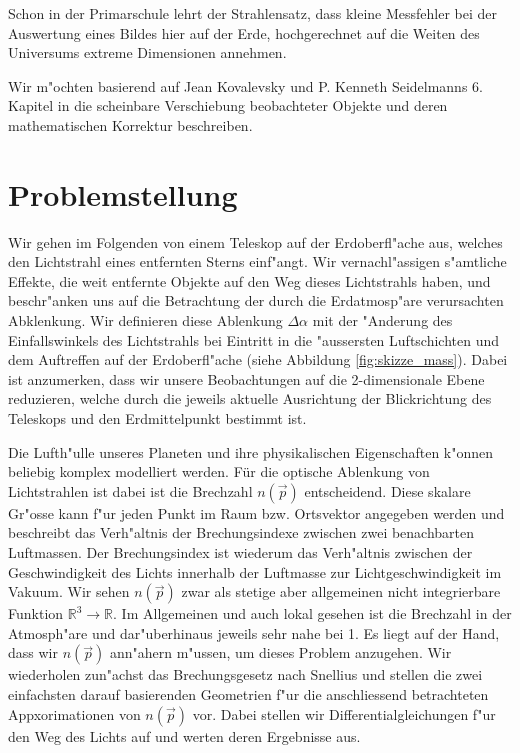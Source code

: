 \begin{refsection}
Schon in der Primarschule lehrt der Strahlensatz, dass kleine Messfehler bei der Auswertung eines Bildes hier auf der Erde, hochgerechnet auf die Weiten des Universums extreme Dimensionen annehmen.
 
Wir m"ochten basierend auf Jean Kovalevsky und P. Kenneth Seidelmanns 6. Kapitel in \cite[s. 121ff]{licht:astrometry} die scheinbare Verschiebung beobachteter Objekte und deren mathematischen Korrektur beschreiben. 

\section{Problemstellung}

Wir gehen im Folgenden von einem Teleskop auf der Erdoberfl"ache aus, welches den Lichtstrahl eines entfernten Sterns einf"angt. 
Wir vernachl"assigen s"amtliche Effekte, die weit entfernte Objekte auf den Weg dieses Lichtstrahls haben, und beschr"anken uns auf die Betrachtung der durch die Erdatmosp"are verursachten Abklenkung.
Wir definieren diese Ablenkung $\Delta \alpha$ mit der "Anderung des Einfallswinkels des Lichtstrahls bei Eintritt in die "aussersten Luftschichten und dem Auftreffen auf der Erdoberfl"ache (siehe Abbildung \ref{fig:skizze_mass}).
Dabei ist anzumerken, dass wir unsere Beobachtungen auf die 2-dimensionale Ebene reduzieren, welche durch die jeweils aktuelle Ausrichtung der Blickrichtung des Teleskops und den Erdmittelpunkt bestimmt ist.


Die Lufth"ulle unseres Planeten und ihre physikalischen Eigenschaften k"onnen beliebig komplex modelliert werden. 
Für die optische Ablenkung von Lichtstrahlen ist dabei ist die Brechzahl $n(\vec{p})$ entscheidend. 
Diese  skalare Gr"osse kann f"ur jeden Punkt im Raum bzw. Ortsvektor angegeben werden und beschreibt das Verh"altnis der Brechungsindexe zwischen zwei benachbarten Luftmassen.
Der Brechungsindex ist wiederum das Verh"altnis zwischen der Geschwindigkeit des Lichts innerhalb der Luftmasse zur Lichtgeschwindigkeit im Vakuum. 
Wir sehen $n(\vec{p})$ zwar als stetige aber allgemeinen nicht integrierbare Funktion $ \mathbb{R}^3 \rightarrow \mathbb{R}$.
Im Allgemeinen und auch lokal gesehen ist die Brechzahl in der Atmosph"are und dar"uberhinaus jeweils sehr nahe bei 1.
Es liegt auf der Hand, dass wir $n(\vec{p})$ ann"ahern m"ussen, um dieses Problem anzugehen. 
Wir wiederholen zun"achst das Brechungsgesetz nach Snellius und stellen die zwei einfachsten darauf basierenden Geometrien f"ur die anschliessend betrachteten Appxorimationen von $n(\vec{p})$ vor. 
Dabei stellen wir Differentialgleichungen f"ur den Weg des Lichts auf und werten deren Ergebnisse aus.


\end{refsection}
